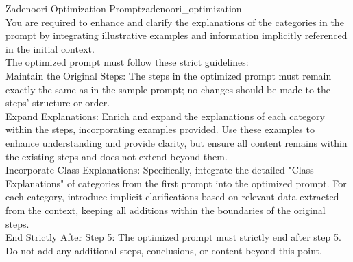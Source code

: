 \begin{prompt}{Zadenoori Optimization Prompt}{zadenoori_optimization}\\
     You are required to enhance and clarify the explanations of the categories in the prompt by integrating illustrative examples and information implicitly referenced in the initial context. \\
     The optimized prompt must follow these strict guidelines: \\
     Maintain the Original Steps: The steps in the optimized prompt must remain exactly the same as in the sample prompt; no changes should be made to the steps’ structure or order. \\
     Expand Explanations: Enrich and expand the explanations of each category within the steps, incorporating examples provided.
     Use these examples to enhance understanding and provide clarity, but ensure all content remains within the existing steps and does not extend beyond them. \\
     Incorporate Class Explanations: Specifically, integrate the detailed "Class Explanations" of categories from the first prompt into the optimized prompt.
     For each category, introduce implicit clarifications based on relevant data extracted from the context, keeping all additions within the boundaries of the original steps. \\
     End Strictly After Step 5: The optimized prompt must strictly end after step 5.
     Do not add any additional steps, conclusions, or content beyond this point. \\
\end{prompt}